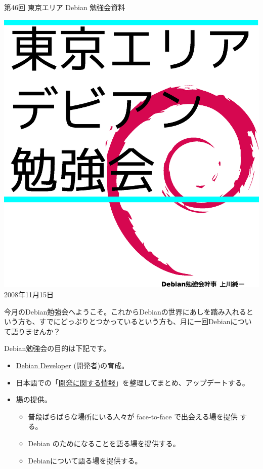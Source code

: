 \documentclass[mingoth,a4paper]{jsarticle}
\newcommand{\debmtgyear}{2008}
\newcommand{\debmtgmonth}{11}
\newcommand{\debmtgdate}{15}
\newcommand{\debmtgnumber}{46}
\begin{document}
\begin{titlepage}
\thispagestyle{empty}


\vspace*{-2cm}
第\debmtgnumber{}回 東京エリア Debian 勉強会資料

\hspace*{-2.4cm}
\includegraphics[width=210mm]{image200801/2008title.eps}\\
\hfill{}\debmtgyear{}年\debmtgmonth{}月\debmtgdate{}日

\end{titlepage}

 
 今月のDebian勉強会へようこそ。これからDebianの世界にあしを踏み入れると
 いう方も、すでにどっぷりとつかっているという方も、月に一回Debianについ
 て語りませんか？

 Debian勉強会の目的は下記です。

\begin{itemize}
 \item \underline{Debian Developer} (開発者)の育成。
 \item 日本語での「\underline{開発に関する情報}」を整理してまとめ、アップデートする。
 \item \underline{場}の提供。
 \begin{itemize}
  \item 普段ばらばらな場所にいる人々が face-to-face で出会える場を提供
	する。
  \item Debian のためになることを語る場を提供する。
  \item Debianについて語る場を提供する。
 \end{itemize}
\end{itemize}		
\end{document}
